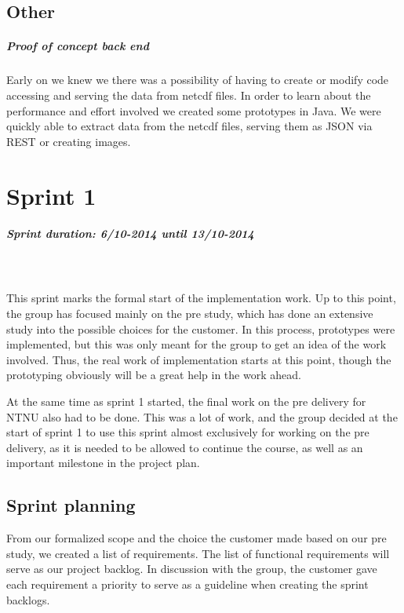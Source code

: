 \documentclass[11pt,a4paper,titlepage,oneside]{report}
\begin{document}
\section{Other}

\paragraph{Proof of concept back end}
Early on we knew we there was a possibility of having to create or modify code accessing and serving the data from \gls{netcdf} files. In order to learn about the performance and effort involved we created some \glspl{prototype} in Java. We were quickly able to extract data from the \gls{netcdf} files, serving them as \gls{JSON} via REST or creating images.


\chapter{Sprint 1}
\paragraph{Sprint duration: 6/10-2014 until 13/10-2014} \hfill \\
\\
\noindent
This sprint marks the formal start of the implementation work. Up to this point, the group has focused mainly on the pre study, which has done an extensive study into the possible choices for the customer. In this process, \glspl{prototype} were implemented, but this was only meant for the group to get an idea of the work involved. Thus, the real work of implementation starts at this point, though the prototyping obviously will be a great help in the work ahead. 

At the same time as sprint 1 started, the final work on the pre delivery for \gls{NTNU} also had to be done. This was a lot of work, and the group decided at the start of sprint 1 to use this sprint almost exclusively for working on the pre delivery, as it is needed to be allowed to continue the course, as well as an important milestone in the project plan. 

\section{Sprint planning}
From our formalized scope and the choice the customer made based on our pre study, we created a list of requirements. The list of functional requirements will serve as our project backlog. In discussion with the group, the customer gave each requirement a priority to serve as a guideline when creating the sprint backlogs.
\end{document}
